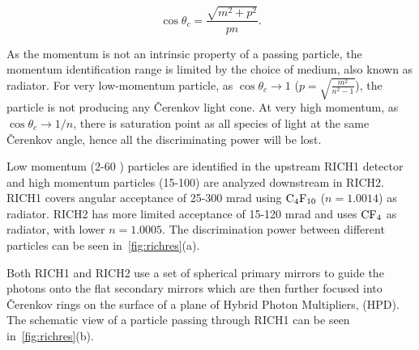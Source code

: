 \begin{equation}
	\cos\theta_{c} =  \frac{\sqrt{m^{2} + p^{2}}}{pn}.
\end{equation}

As the momentum is not an intrinsic property of a passing particle, the momentum identification range is limited by the choice of medium, also known as radiator. For very low-momentum particle, as $\cos\theta_{c} \rightarrow 1$ ($p=\sqrt{\frac{m^{2}}{n^{2}-1}}$), the particle is not producing any \v{C}erenkov light cone. At \DIFdelbegin {}\DIFdelend very high momentum, as $\cos\theta_{c} \rightarrow 1/n$, there is \DIFaddbegin {}\DIFaddend saturation point as all species of \DIFdelbegin {}\DIFdelend \DIFaddbegin {}\DIFaddend light at the same \v{C}erenkov angle, hence all the discriminating power will be lost.

Low momentum (2-60 \gev) particles are identified in the upstream \gls{RICH1} detector and high momentum particles (15-100) \gev are analyzed downstream in \gls{RICH2}. \gls{RICH1} covers \DIFaddbegin {}\DIFaddend angular acceptance of 25-300 mrad using $\rm{C_{4}F_{10}}$ ($n = 1.0014$) as \DIFaddbegin {}\DIFaddend radiator. \gls{RICH2} has \DIFaddbegin {}\DIFaddend more limited acceptance of 15-120 mrad and uses $\rm{CF_{4}}$ as \DIFaddbegin {}\DIFaddend radiator, with lower $n=1.0005$. The discrimination power between different particles can be seen in~\autoref{fig:richres}(a). 


Both \gls{RICH1} and \gls{RICH2} use a set of spherical primary mirrors to guide the photons onto the flat secondary mirrors which are then further focused into \v{C}erenkov rings on the surface of a plane of Hybrid Photon Multipliers, (\Gls{HPD}). The schematic view of a particle passing through \gls{RICH1} can be seen in~\autoref{fig:richres}(b). 


